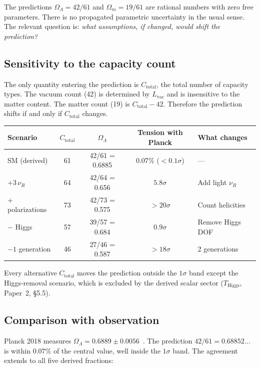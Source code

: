 \documentclass[11pt,a4paper]{article}
\theoremstyle{definition}
\begin{document}

The predictions $\Omega_\Lambda = 42/61$ and $\Omega_m = 19/61$ are
rational numbers with zero free parameters.  There is no propagated
parametric uncertainty in the usual sense.  The relevant question is:
\emph{what assumptions, if changed, would shift the prediction?}

\subsection{Sensitivity to the capacity count}
\label{sec:sensitivity}

The only quantity entering the prediction is $C_{\mathrm{total}}$, the
total number of capacity types.  The vacuum count (42) is determined by
$L_{\mathrm{vac}}$ and is insensitive to the matter content.  The matter
count (19) is $C_{\mathrm{total}} - 42$.  Therefore the prediction shifts
if and only if $C_{\mathrm{total}}$ changes.

\smallskip
\begin{center}
\small
\begin{tabular}{@{}lcccl@{}}
\toprule
\textbf{Scenario} & $C_{\mathrm{total}}$ & $\Omega_\Lambda$ &
  \textbf{Tension with Planck} & \textbf{What changes} \\
\midrule
SM (derived) & 61 & 42/61 = 0.6885 & $0.07\%$ ($<0.1\sigma$) & --- \\
$+3\,\nu_R$ & 64 & 42/64 = 0.656 & $5.8\sigma$ & Add light $\nu_R$ \\
$+$ polarizations & 73 & 42/73 = 0.575 & $>20\sigma$ & Count helicities \\
$-$ Higgs & 57 & 39/57 = 0.684 & $0.9\sigma$ & Remove Higgs DOF \\
$-1$ generation & 46 & 27/46 = 0.587 & $>18\sigma$ & 2 generations \\
\bottomrule
\end{tabular}
\end{center}

\smallskip\noindent Every alternative $C_{\mathrm{total}}$ moves the
prediction outside the $1\sigma$ band except the Higgs-removal scenario,
which is excluded by the derived scalar sector ($T_{\mathrm{Higgs}}$,
Paper~2, \S5.5).

\subsection{Comparison with observation}

Planck 2018 measures
$\Omega_\Lambda = 0.6889 \pm 0.0056$~\cite{Planck2020}.
The prediction $42/61 = 0.68852\ldots$ is within $0.07\%$ of the
central value, well inside the $1\sigma$ band.  The agreement extends
to all five derived fractions:
\end{document}
